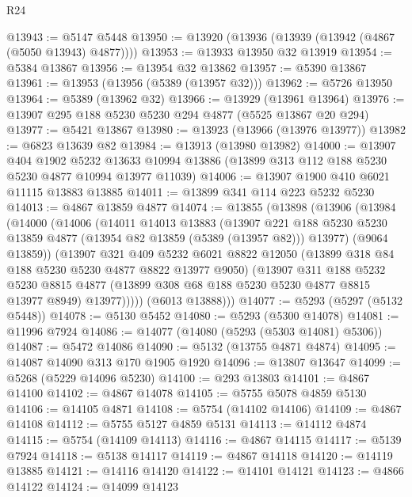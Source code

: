 \begin{lexlean}{R24}
\begin{coremodule}
@13943 := @5147 @5448
@13950 := @13920 (@13936 (@13939 (@13942 (@4867 (@5050 @13943) @4877))))
@13953 := @13933 @13950 @32 @13919
@13954 := @5384 @13867
@13956 := @13954 @32 @13862
@13957 := @5390 @13867
@13961 := @13953 (@13956 (@5389 (@13957 @32)))
@13962 := @5726 @13950
@13964 := @5389 (@13962 @32)
@13966 := @13929 (@13961 @13964)
@13976 := @13907 @295 @188 @5230 @5230 @294 @4877 (@5525 @13867 @20 @294)
@13977 := @5421 @13867
@13980 := @13923 (@13966 (@13976 @13977))
@13982 := @6823 @13639 @82
@13984 := @13913 (@13980 @13982)
@14000 := @13907
    @404
    @1902
    @5232
    @13633
    @10994
    @13886
    (@13899 @313 @112 @188 @5230 @5230 @4877 @10994 @13977 @11039)
@14006 := @13907 @1900 @410 @6021 @11115 @13883 @13885
@14011 := @13899 @341 @114 @223 @5232 @5230
@14013 := @4867 @13859 @4877
@14074 := @13855
    (@13898
      (@13906
        (@13984
          (@14000
            (@14006
              (@14011
                @14013
                @13883
                (@13907
                  @221
                  @188
                  @5230
                  @5230
                  @13859
                  @4877
                  (@13954 @82 @13859 (@5389 (@13957 @82)))
                  @13977)
                (@9064 @13859))
              (@13907
                @321
                @409
                @5232
                @6021
                @8822
                @12050
                (@13899 @318 @84 @188 @5230 @5230 @4877 @8822 @13977 @9050)
                (@13907
                  @311
                  @188
                  @5232
                  @5230
                  @8815
                  @4877
                  (@13899 @308 @68 @188 @5230 @5230 @4877 @8815 @13977 @8949)
                  @13977)))))
        (@6013 @13888)))
@14077 := @5293 (@5297 (@5132 @5448))
@14078 := @5130 @5452
@14080 := @5293 (@5300 @14078)
@14081 := @11996 @7924
@14086 := @14077 (@14080 (@5293 (@5303 @14081) @5306))
@14087 := @5472 @14086
@14090 := @5132 (@13755 @4871 @4874)
@14095 := @14087 @14090 @313 @170 @1905 @1920
@14096 := @13807 @13647
@14099 := @5268 (@5229 @14096 @5230)
@14100 := @293 @13803
@14101 := @4867 @14100
@14102 := @4867 @14078
@14105 := @5755 @5078 @4859 @5130
@14106 := @14105 @4871
@14108 := @5754 (@14102 @14106)
@14109 := @4867 @14108
@14112 := @5755 @5127 @4859 @5131
@14113 := @14112 @4874
@14115 := @5754 (@14109 @14113)
@14116 := @4867 @14115
@14117 := @5139 @7924
@14118 := @5138 @14117
@14119 := @4867 @14118
@14120 := @14119 @13885
@14121 := @14116 @14120
@14122 := @14101 @14121
@14123 := @4866 @14122
@14124 := @14099 @14123

\end{coremodule}
\end{lexlean}
